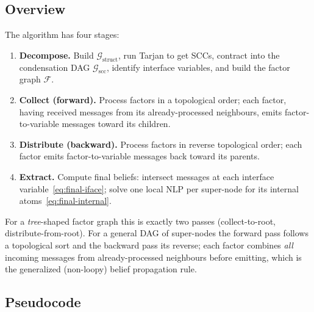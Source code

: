 \documentclass[11pt]{article}
\newcommand{\cG}{\mathcal{G}}
\newcommand{\cF}{\mathcal{F}}
\newcommand{\scc}{\mathrm{scc}}
\begin{document}
\subsection{Overview}
The algorithm has four stages:
\begin{enumerate}
  \item \textbf{Decompose.} Build $\cG_{\text{struct}}$, run Tarjan to get
        SCCs, contract into the condensation DAG $\cG_{\scc}$, identify
        interface variables, and build the factor graph $\cF$.
  \item \textbf{Collect (forward).} Process factors in a topological order;
        each factor, having received messages from its already-processed
        neighbours, emits factor-to-variable messages toward its children.
  \item \textbf{Distribute (backward).} Process factors in reverse topological
        order; each factor emits factor-to-variable messages back toward its
        parents.
  \item \textbf{Extract.} Compute final beliefs: intersect messages at each
        interface variable~\eqref{eq:final-iface}; solve one local NLP per
        super-node for its internal atoms~\eqref{eq:final-internal}.
\end{enumerate}
For a \emph{tree}-shaped factor graph this is exactly two passes
(collect-to-root, distribute-from-root). For a general DAG of super-nodes the
forward pass follows a topological sort and the backward pass its reverse;
each factor combines \emph{all} incoming messages from already-processed
neighbours before emitting, which is the generalized (non-loopy) belief
propagation rule.

\subsection{Pseudocode}
\end{document}
